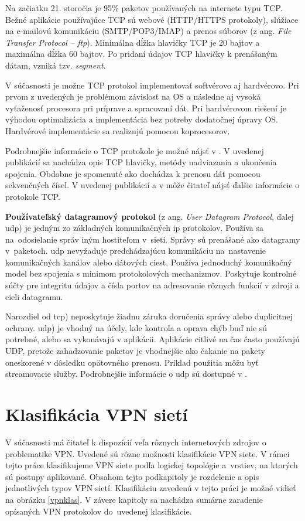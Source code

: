 Na začiatku 21. storočia je 95\% paketov používaných na internete typu TCP. Bežné aplikácie používajúce TCP sú webové (HTTP/HTTPS protokoly), slúžiace na e-mailovú komunikáciu (SMTP/POP3/IMAP) a prenos súborov (z ang. \textit{File Transfer Protocol -- \acrshort{ftp}}). Minimálna dĺžka hlavičky TCP je 20 bajtov a maximálna dĺžka 60 bajtov. Po pridaní údajov TCP hlavičky k prenášaným dátam, vzniká tzv. \textit{segment}.

V súčasnosti je možne TCP protokol implementovať softvérovo aj hardvérovo. Pri prvom z uvedených je problémom závislosť na OS a následne aj vysoká vyťaženosť procesora pri príprave a spracovaní dát. Pri hardvérovom riešení je výhodou optimalizácia a implementácia bez potreby dodatočnej úpravy OS. Hardvérové implementácie sa realizujú pomocou koprocesorov.

Podrobnejšie informácie o TCP protokole je možné nájsť v \cite{tcp2}. V uvedenej publikácií sa nachádza opis TCP hlavičky, metódy nadviazania a ukončenia spojenia. Obdobne je spomenuté ako dochádza k prenosu dát pomocou sekvenčných čísel. V uvedenej publikácií a v \cite{tcpguide} môže čitateľ nájsť ďalšie informácie o protokole TCP.

\textbf{Používateľský datagramový protokol} (z ang. \textit{User Datagram Protocol}, ďalej \acrshort{udp}) je jedným zo základných komunikačných \acrshort{ip} protokolov. Používa sa na~odosielanie správ iným hostiteľom v~sieti. Správy sú prenášané ako datagramy v~paketoch. \acrshort{udp} nevyžaduje predchádzajúcu komunikáciu na~nastavenie komunikačných kanálov alebo dátových ciest. Používa jednoduchý komunikačný model bez spojenia s minimom protokolových mechanizmov. Poskytuje kontrolné súčty pre integritu údajov a čísla portov na adresovanie rôznych funkcií v zdroji a cieli datagramu. 

Narozdiel od \acrshort{tcp}) neposkytuje žiadnu záruka doručenia správy alebo duplicitnej ochrany. 
\acrshort{udp}) je vhodný na účely, kde kontrola a oprava chýb buď nie sú potrebné, alebo sa vykonávajú v aplikácii. Aplikácie citlivé na čas často používajú UDP, pretože zahadzovanie paketov je vhodnejšie ako čakanie na pakety oneskorené v dôsledku opätovného prenosu. Príklad použitia môžu byť streamovacie služby. 
Podrobnejšie informácie o \acrshort{udp} sú dostupné v \cite{udp}.

\section{Klasifikácia VPN sietí}
V súčasnosti má čitateľ k dispozícií veľa rôznych internetových zdrojov o problematike VPN. Uvedené sú rôzne možnosti klasifikácie VPN siete. V rámci tejto práce klasifikujeme VPN siete podľa logickej topológie a~vrstiev, na ktorých sú postupy aplikované. Obsahom tejto podkapitoly je rozdelenie a opis jednotlivých typov VPN sietí. Klasifikáciu zavedenú v tejto práci je možné vidieť na obrázku \ref{vpnklas}. V závere kapitoly sa nachádza sumárne zaradenie opísaných VPN protokolov do~uvedenej klasifikácie.


